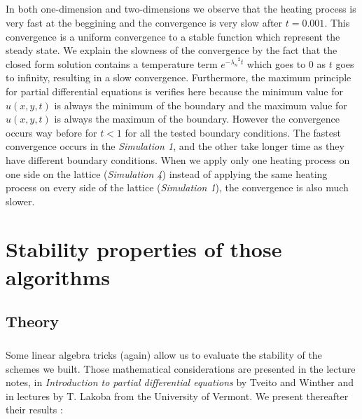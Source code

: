\documentclass[a4paper, twoside, 11pt]{report}
\theoremstyle{theorem}
\theoremstyle{remark}
\theoremstyle{exemple}
\begin{document}
            \paragraph{}In both one-dimension and two-dimensions we observe that the heating process is very fast at the beggining and the convergence is very slow after $t=0.001$. This convergence is a uniform convergence to a stable function which represent the steady state. We explain the slowness of the convergence by the fact that the closed form solution contains a temperature term ${e}^{-{{\lambda}_{n}}^{2}t}$ which goes to $0$ as $t$ goes to infinity, resulting in a slow convergence. Furthermore, the maximum principle for partial differential equations is verifies here because the minimum value for $u(x,y,t)$ is always the minimum of the boundary and the maximum value for $u(x,y,t)$ is always the maximum of the boundary. However the convergence occurs way before for $t<1$ for all the tested boundary conditions. The fastest convergence occurs in the \emph{Simulation 1}, and the other take longer time as they have different boundary conditions. When we apply only one heating process on one side on the lattice (\emph{Simulation 4}) instead of applying the same heating process on every side of the lattice (\emph{Simulation 1}), the convergence is also much slower.

\chapter{Stability properties of those algorithms}

    \section{Theory}

        \paragraph{}Some linear algebra tricks (again) allow us to evaluate the stability of the schemes we built. Those mathematical considerations are presented in the lecture notes, in \emph{Introduction to partial differential equations} by Tveito and Winther and in lectures by T. Lakoba from the University of Vermont. We present thereafter their results :
\end{document}
